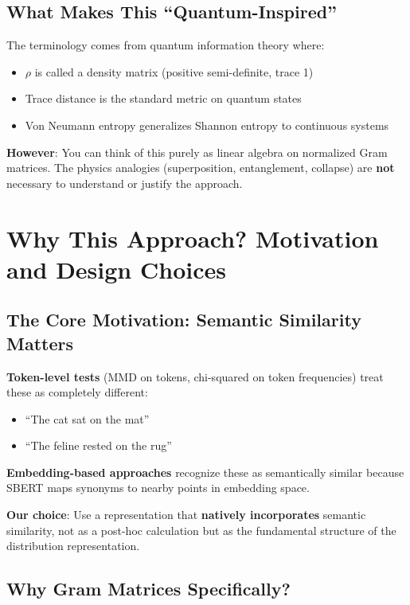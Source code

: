 \documentclass[11pt]{article}
\begin{document}
\subsection{What Makes This ``Quantum-Inspired''}

The terminology comes from quantum information theory where:
\begin{itemize}
\item $\rho$ is called a density matrix (positive semi-definite, trace 1)
\item Trace distance is the standard metric on quantum states
\item Von Neumann entropy generalizes Shannon entropy to continuous systems
\end{itemize}

\textbf{However}: You can think of this purely as linear algebra on normalized Gram matrices. The physics analogies (superposition, entanglement, collapse) are \textbf{not} necessary to understand or justify the approach.

\section{Why This Approach? Motivation and Design Choices}

\subsection{The Core Motivation: Semantic Similarity Matters}

\textbf{Token-level tests} (MMD on tokens, chi-squared on token frequencies) treat these as completely different:
\begin{itemize}
\item ``The cat sat on the mat''
\item ``The feline rested on the rug''
\end{itemize}

\textbf{Embedding-based approaches} recognize these as semantically similar because SBERT maps synonyms to nearby points in embedding space.

\textbf{Our choice}: Use a representation that \textbf{natively incorporates} semantic similarity, not as a post-hoc calculation but as the fundamental structure of the distribution representation.

\subsection{Why Gram Matrices Specifically?}
\end{document}
